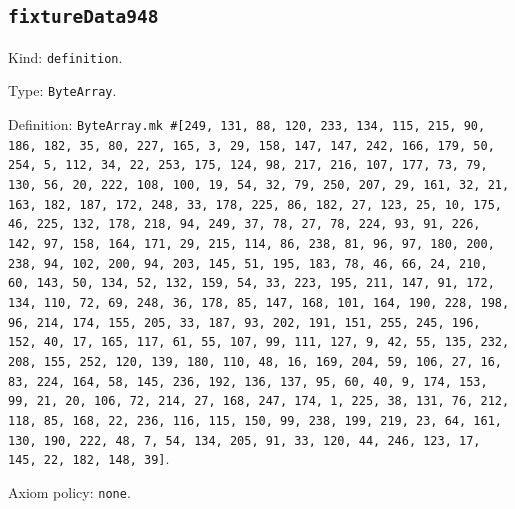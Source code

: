 \documentclass[11pt]{article}
\begin{document}
\subsection*{\texttt{fixtureData948}}
\noindent Kind: \texttt{definition}.\par
\noindent Type: \texttt{ByteArray}.\par
\noindent Definition: \texttt{ByteArray.mk \#[249, 131, 88, 120, 233, 134, 115, 215, 90, 186, 182, 35, 80, 227, 165, 3, 29, 158, 147, 147, 242, 166, 179, 50, 254, 5, 112, 34, 22, 253, 175, 124, 98, 217, 216, 107, 177, 73, 79, 130, 56, 20, 222, 108, 100, 19, 54, 32, 79, 250, 207, 29, 161, 32, 21, 163, 182, 187, 172, 248, 33, 178, 225, 86, 182, 27, 123, 25, 10, 175, 46, 225, 132, 178, 218, 94, 249, 37, 78, 27, 78, 224, 93, 91, 226, 142, 97, 158, 164, 171, 29, 215, 114, 86, 238, 81, 96, 97, 180, 200, 238, 94, 102, 200, 94, 203, 145, 51, 195, 183, 78, 46, 66, 24, 210, 60, 143, 50, 134, 52, 132, 159, 54, 33, 223, 195, 211, 147, 91, 172, 134, 110, 72, 69, 248, 36, 178, 85, 147, 168, 101, 164, 190, 228, 198, 96, 214, 174, 155, 205, 33, 187, 93, 202, 191, 151, 255, 245, 196, 152, 40, 17, 165, 117, 61, 55, 107, 99, 111, 127, 9, 42, 55, 135, 232, 208, 155, 252, 120, 139, 180, 110, 48, 16, 169, 204, 59, 106, 27, 16, 83, 224, 164, 58, 145, 236, 192, 136, 137, 95, 60, 40, 9, 174, 153, 99, 21, 20, 106, 72, 214, 27, 168, 247, 174, 1, 225, 38, 131, 76, 212, 118, 85, 168, 22, 236, 116, 115, 150, 99, 238, 199, 219, 23, 64, 161, 130, 190, 222, 48, 7, 54, 134, 205, 91, 33, 120, 44, 246, 123, 17, 145, 22, 182, 148, 39]}.\par
\noindent Axiom policy: \texttt{none}.\par
\end{document}
